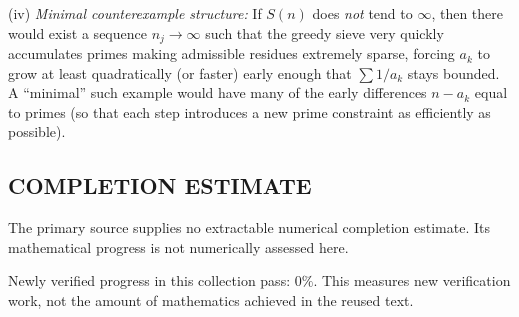 (iv) \emph{Minimal counterexample structure:} If $S(n)$ does \emph{not} tend to $\infty$, then there would exist a sequence $n_j\to\infty$ such that the greedy sieve very quickly accumulates primes making admissible residues extremely sparse, forcing $a_k$ to grow at least quadratically (or faster) early enough that $\sum 1/a_k$ stays bounded. A ``minimal'' such example would have many of the early differences $n-a_k$ equal to primes (so that each step introduces a new prime constraint as efficiently as possible).




\subsection*{COMPLETION ESTIMATE}
The primary source supplies no extractable numerical completion estimate. Its mathematical progress is not numerically assessed here.

Newly verified progress in this collection pass: $0\%$. This measures new verification work, not the amount of mathematics achieved in the reused text.
